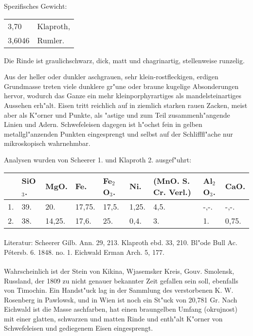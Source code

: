 \documentclass[a4paper, 11pt, oneside]{article}
\begin{document}
Spezifisches Gewicht:
\begin{table}[!ht]
    \centering\swabfamily\Large
    \begin{tabular}{l l}
        3,70 & Klaproth,\\
        3,6046 & Rumler.
    \end{tabular}
\end{table}

Die Rinde ist graulichschwarz, dick, matt und chagrinartig, stellenweise runzelig.

Aus der heller oder dunkler aschgrauen, sehr klein-rostfleckigen, erdigen Grundmasse treten viele dunklere gr"une oder braune kugelige Absonderungen hervor, wodurch das Ganze ein mehr kleinporphyrartiges als mandelsteinartiges Aussehen erh"alt. Eisen tritt reichlich auf in ziemlich starken rauen Zacken, meist aber als K"orner und Punkte, als "astige und zum Teil zusammenh"angende Linien und Adern. Schwefeleisen dagegen ist h"ochst fein in gelben metallgl"anzenden Punkten eingesprengt und selbst auf der Schlifffl"ache nur mikroskopisch wahrnehmbar.

Analysen wurden von Scheerer 1. und Klaproth 2. ausgef"uhrt:
\begin{table}[!ht]
    \centering\swabfamily\Large
    \normalsize
    \begin{tabular}{l l l l l l p{25mm} l l}
         & SiO$_{3}$. & MgO. & Fe. & Fe$_{2}$O$_{3}$. & Ni. & (MnO. S. Cr. Verl.) & Al$_{2}$O$_{3}$. & CaO. \\ \hline
        1. & 39. & 20. & 17,75. & 17,5. & 1,25. & 4,5. & -,-. & -,-. \\
        2. & 38. & 14,25. & 17,6. & 25. & 0,4. & 3. & 1. & 0,75. \\
    \end{tabular}
\end{table}
\normalsize
\paragraph{}
Literatur: Scheerer Gilb. Ann. 29, 213. Klaproth ebd. 33, 210. Bl"ode Bull Ac. Pétersb. 6. 1848. no. 1. Eichwald Erman Arch. 5, 177.
\LARGE
\paragraph{}
Wahrscheinlich ist der Stein von Kikina, Wjasemsker Kreis, Gouv. Smolensk, Russland, der 1809 zu nicht genauer bekannter Zeit gefallen sein soll, ebenfalls von Timochin. Ein Handst"uck lag in der Sammlung des verstorbenen K. W. Rosenberg in Pawlowsk, und in Wien ist noch ein St"uck von 20,781 Gr. Nach Eichwald ist die Masse aschfarben, hat einen braungelben Umfang (okrujnost) mit einer glatten, schwarzen und matten Rinde und enth"alt K"orner von Schwefeleisen und gediegenem Eisen eingesprengt.
\normalsize
\end{document}
